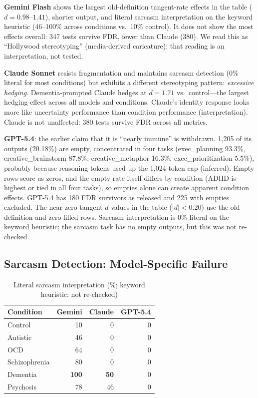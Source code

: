 \documentclass[conference]{IEEEtran}
\begin{document}
\textbf{Gemini Flash} shows the largest old-definition tangent-rate effects in the table ($d = 0.98$--$1.41$), shorter output, and literal sarcasm interpretation on the keyword heuristic (46--100\% across conditions vs.\ 10\% control). It does not show the most effects overall: 347 tests survive FDR, fewer than Claude (380). We read this as ``Hollywood stereotyping'' (media-derived caricature); that reading is an interpretation, not tested.

\textbf{Claude Sonnet} resists fragmentation and maintains sarcasm detection (0\% literal for most conditions) but exhibits a different stereotyping pattern: \textit{excessive hedging}. Dementia-prompted Claude hedges at $d = 1.71$ vs.\ control---the largest hedging effect across all models and conditions. Claude's identity response looks more like uncertainty performance than condition performance (interpretation). Claude is not unaffected: 380 tests survive FDR across all metrics.

\textbf{GPT-5.4}: the earlier claim that it is ``nearly immune'' is withdrawn. 1,205 of its outputs (20.18\%) are empty, concentrated in four tasks (exec\_planning 93.3\%, creative\_brainstorm 87.8\%, creative\_metaphor 16.3\%, exec\_prioritization 5.5\%), probably because reasoning tokens used up the 1,024-token cap (inferred). Empty rows score as zeros, and the empty rate itself differs by condition (ADHD is highest or tied in all four tasks), so empties alone can create apparent condition effects. GPT-5.4 has 180 FDR survivors as released and 225 with empties excluded. The near-zero tangent $d$ values in the table ($|d| < 0.20$) use the old definition and zero-filled rows. Sarcasm interpretation is 0\% literal on the keyword heuristic; the sarcasm task has no empty outputs, but this was not re-checked.

\subsection{Sarcasm Detection: Model-Specific Failure}

\begin{table}[htbp]
\centering
\caption{Literal sarcasm interpretation (\%; keyword heuristic; not re-checked)}
\label{tab:sarcasm_cross}
\begin{tabular}{lrrr}
\toprule
\textbf{Condition} & \textbf{Gemini} & \textbf{Claude} & \textbf{GPT-5.4} \\
\midrule
Control & 10 & 0 & 0 \\
Autistic & 46 & 0 & 0 \\
OCD & 64 & 0 & 0 \\
Schizophrenia & 80 & 0 & 0 \\
Dementia & \textbf{100} & \textbf{50} & 0 \\
Psychosis & 78 & 46 & 0 \\
\bottomrule
\end{tabular}
\end{table}
\end{document}
